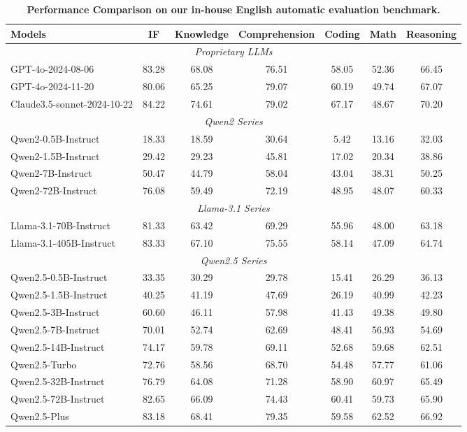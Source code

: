 \begin{table}[tbp]
\centering
\small
\caption{\textbf{Performance Comparison on our in-house English automatic evaluation benchmark.} }
\label{tab:eval_v11_EN}
\begin{tabular}{@{}lcccccc@{}}
\toprule
\textbf{Models} & \textbf{IF} & \textbf{Knowledge} & \textbf{Comprehension} & \textbf{Coding} & \textbf{Math} & \textbf{Reasoning} \\
\midrule
\multicolumn{7}{c}{\textit{Proprietary LLMs}} \\
\midrule
GPT-4o-2024-08-06 & 83.28 & 68.08 & 76.51 & 58.05 & 52.36 & 66.45 \\
GPT-4o-2024-11-20 & 80.06 & 65.25 & 79.07 & 60.19 & 49.74 & 67.07 \\
Claude3.5-sonnet-2024-10-22 & 84.22 & 74.61 & 79.02 & 67.17 & 48.67 & 70.20\\
\midrule
\multicolumn{7}{c}{\textit{Qwen2 Series}} \\
\midrule
Qwen2-0.5B-Instruct & 18.33 & 18.59 & 30.64 & 5.42 & 13.16 & 32.03 \\
Qwen2-1.5B-Instruct & 29.42 & 29.23 & 45.81 & 17.02 & 20.34 & 38.86 \\
Qwen2-7B-Instruct & 50.47 & 44.79 & 58.04 & 43.04 & 38.31 & 50.25 \\
Qwen2-72B-Instruct & 76.08 & 59.49 & 72.19 & 48.95 & 48.07 & 60.33 \\
\midrule
\multicolumn{7}{c}{\textit{Llama-3.1 Series}} \\
\midrule
Llama-3.1-70B-Instruct & 81.33 & 63.42 & 69.29 & 55.96 & 48.00 & 63.18 \\
Llama-3.1-405B-Instruct & 83.33 & 67.10 & 75.55 & 58.14 & 47.09 & 64.74\\
\midrule
\multicolumn{7}{c}{\textit{Qwen2.5 Series}} \\
\midrule
Qwen2.5-0.5B-Instruct & 33.35 & 30.29 & 29.78 & 15.41 & 26.29 & 36.13 \\
Qwen2.5-1.5B-Instruct & 40.25 & 41.19 & 47.69 & 26.19 & 40.99 & 42.23 \\
Qwen2.5-3B-Instruct & 60.60 & 46.11 & 57.98 & 41.43 & 49.38 & 49.80 \\
Qwen2.5-7B-Instruct & 70.01 & 52.74 & 62.69 & 48.41 & 56.93 & 54.69 \\
Qwen2.5-14B-Instruct & 74.17 & 59.78 & 69.11 & 52.68 & 59.68 & 62.51 \\
Qwen2.5-Turbo        & 72.76 & 58.56 & 68.70 & 54.48 & 57.77 & 61.06 \\
Qwen2.5-32B-Instruct & 76.79 & 64.08 & 71.28 & 58.90 & 60.97 & 65.49 \\
Qwen2.5-72B-Instruct & 82.65 & 66.09 & 74.43 & 60.41 & 59.73 & 65.90 \\
Qwen2.5-Plus         & 83.18 & 68.41 & 79.35 & 59.58 & 62.52 & 66.92 \\
\bottomrule
\end{tabular}
\end{table}

